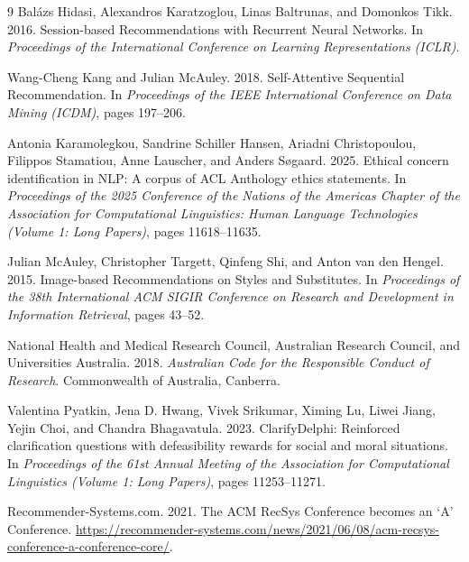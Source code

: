 \documentclass[11pt]{article}
\begin{document}
\begin{thebibliography}{9}
Bal\'azs Hidasi, Alexandros Karatzoglou, Linas Baltrunas, and Domonkos Tikk. 2016.
\newblock Session-based Recommendations with Recurrent Neural Networks.
\newblock In \emph{Proceedings of the International Conference on Learning
Representations (ICLR)}.

Wang-Cheng Kang and Julian McAuley. 2018.
\newblock Self-Attentive Sequential Recommendation.
\newblock In \emph{Proceedings of the IEEE International Conference on Data Mining
(ICDM)}, pages 197--206.

Antonia Karamolegkou, Sandrine Schiller Hansen, Ariadni Christopoulou, Filippos
Stamatiou, Anne Lauscher, and Anders S{\o}gaard. 2025.
\newblock Ethical concern identification in NLP: A corpus of ACL Anthology ethics
statements.
\newblock In \emph{Proceedings of the 2025 Conference of the Nations of the Americas
Chapter of the Association for Computational Linguistics: Human Language Technologies
(Volume 1: Long Papers)}, pages 11618--11635.

Julian McAuley, Christopher Targett, Qinfeng Shi, and Anton van den Hengel. 2015.
\newblock Image-based Recommendations on Styles and Substitutes.
\newblock In \emph{Proceedings of the 38th International ACM SIGIR Conference on Research
and Development in Information Retrieval}, pages 43--52.

National Health and Medical Research Council, Australian Research Council, and
Universities Australia. 2018.
\newblock \emph{Australian Code for the Responsible Conduct of Research}.
\newblock Commonwealth of Australia, Canberra.

Valentina Pyatkin, Jena D. Hwang, Vivek Srikumar, Ximing Lu, Liwei Jiang, Yejin Choi,
and Chandra Bhagavatula. 2023.
\newblock ClarifyDelphi: Reinforced clarification questions with defeasibility
rewards for social and moral situations.
\newblock In \emph{Proceedings of the 61st Annual Meeting of the Association for
Computational Linguistics (Volume 1: Long Papers)}, pages 11253--11271.

Recommender-Systems.com. 2021.
\newblock The ACM RecSys Conference becomes an `A' Conference.
\newblock \url{https://recommender-systems.com/news/2021/06/08/acm-recsys-conference-a-conference-core/}.

\end{thebibliography}
\end{document}
